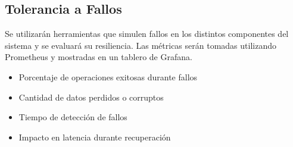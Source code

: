 \subsection{Tolerancia a Fallos}

Se utilizarán herramientas que simulen fallos en los distintos componentes del sistema y se evaluará su resiliencia. 
Las métricas serán tomadas utilizando Prometheus y mostradas en un tablero de Grafana.

\begin{itemize}
    \item Porcentaje de operaciones exitosas durante fallos
    \item Cantidad de datos perdidos o corruptos
    \item Tiempo de detección de fallos
    \item Impacto en latencia durante recuperación
\end{itemize}